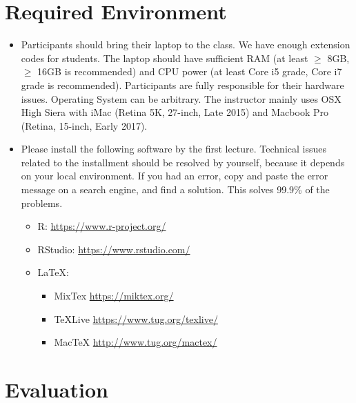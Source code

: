 \documentclass[]{book}
\providecommand{\tightlist}{%
  \setlength{\itemsep}{0pt}\setlength{\parskip}{0pt}}
\begin{document}
\section{Required Environment}\label{required-environment}

\begin{itemize}
\tightlist
\item
  Participants should bring their laptop to the class. We have enough
  extension codes for students. The laptop should have sufficient RAM
  (at least \(\ge\) 8GB, \(\ge\) 16GB is recommended) and CPU power (at
  least Core i5 grade, Core i7 grade is recommended). Participants are
  fully responsible for their hardware issues. Operating System can be
  arbitrary. The instructor mainly uses OSX High Siera with iMac (Retina
  5K, 27-inch, Late 2015) and Macbook Pro (Retina, 15-inch, Early 2017).
\item
  Please install the following software by the first lecture. Technical
  issues related to the installment should be resolved by yourself,
  because it depends on your local environment. If you had an error,
  copy and paste the error message on a search engine, and find a
  solution. This solves 99.9\% of the problems.

  \begin{itemize}
  \tightlist
  \item
    R: \url{https://www.r-project.org/}
  \item
    RStudio: \url{https://www.rstudio.com/}
  \item
    LaTeX:

    \begin{itemize}
    \tightlist
    \item
      MixTex \url{https://miktex.org/}
    \item
      TeXLive \url{https://www.tug.org/texlive/}
    \item
      MacTeX \url{http://www.tug.org/mactex/}
    \end{itemize}
  \end{itemize}
\end{itemize}

\section{Evaluation}\label{evaluation}
\end{document}
